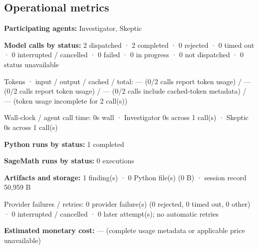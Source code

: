 \documentclass[11pt]{article}
\begin{document}
\subsection{Operational metrics}
\textbf{Participating agents:} Investigator, Skeptic\par
\textbf{Model calls by status:} 2 dispatched · 2 completed · 0 rejected · 0 timed out · 0 interrupted / cancelled · 0 failed · 0 in progress · 0 not dispatched · 0 status unavailable\par
Tokens · input / output / cached / total: — (0/2 calls report token usage) / — (0/2 calls report token usage) / — (0/2 calls include cached-token metadata) / — (token usage incomplete for 2 call(s))\par
Wall-clock / agent call time: 0s wall · Investigator 0s across 1 call(s) · Skeptic 0s across 1 call(s)\par
\textbf{Python runs by status:} 1 completed\par
\textbf{SageMath runs by status:} 0 executions\par
\textbf{Artifacts and storage:} 1 finding(s) · 0 Python file(s) (0 B) · session record 50,959 B\par
Provider failures / retries: 0 provider failure(s) (0 rejected, 0 timed out, 0 other) · 0 interrupted / cancelled · 0 later attempt(s); no automatic retries\par
\textbf{Estimated monetary cost:} — (complete usage metadata or applicable price unavailable)\par
\end{document}
